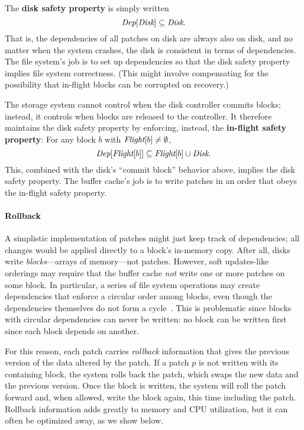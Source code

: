 The \textbf{disk safety property} is simply written
%
\[ \PDepset{\PDisk} \subseteq \PDisk. \]
%
That is, the dependencies of all patches on disk are always also on disk,
and
%
no matter when the system crashes, the disk is consistent in terms of
dependencies.
%
The file system's job is to set up dependencies so that the disk safety
property implies file system correctness.
%
(This might involve compensating for the possibility that in-flight blocks
can be corrupted on recovery.)


The storage system cannot control when the disk controller commits blocks;
instead, it controls when blocks are released to the controller.
%
It therefore maintains the disk safety property by enforcing, instead, the
\textbf{in-flight safety property}: For any block $b$ with $\PInf[b] \neq
\emptyset$,
%
\[ \PDepset{\PInf[b]} \subseteq \PInf[b] \cup \PDisk . \]
%
This, combined with the disk's ``commit block'' behavior above, implies the
disk safety property.
%
The buffer cache's job is to write patches in an order that obeys the
in-flight safety property.


\paragraph{Rollback}
%
A simplistic implementation of patches might just keep track of
dependencies; all changes would be applied directly to a block's in-memory
copy.
%
After all, disks write \emph{blocks}---arrays of memory---not patches.
%
However, soft updates-like orderings may require that the buffer cache
\emph{not} write one or more patches on some block.
%
In particular, a series of file system operations may create dependencies
that enforce a circular order among blocks, even though the dependencies
themselves do not form a cycle~\cite{ganger00soft}.
%
This is problematic since blocks with circular dependencies can never be
written: no block can be written first since each block depends on another.


For this reason, each patch carries \emph{rollback} information that gives
the previous version of the data altered by the patch.
%
If a patch $p$ is not written with its containing block, the system rolls
back the patch, which swaps the new data and the previous version.
%
Once the block is written, the system will roll the patch forward and, when
allowed, write the block again, this time including the patch.
%
Rollback information adds greatly to memory and CPU utilization, but it can
often be optimized away, as we show below.


